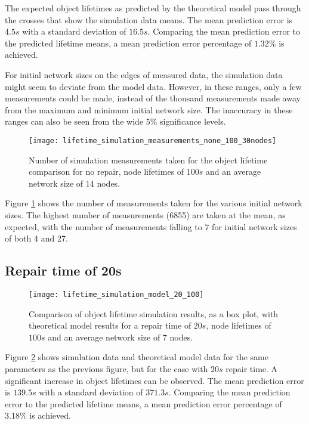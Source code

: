 The expected object lifetimes as predicted by the theoretical model pass through the crosses that show the simulation data means. The mean prediction error is $4.5s$ with a standard deviation of $16.5s$. Comparing the mean prediction error to the predicted lifetime means, a mean prediction error percentage of $1.32\%$ is achieved. 

For initial network sizes on the edges of measured data, the simulation data might seem to deviate from the model data. However, in these ranges, only a few measurements could be made, instead of the thousand measurements made away from the maximum and minimum initial network size. The inaccuracy in these ranges can also be seen from the wide 5\% significance levels.

\begin{figure}[htbp]
 \centering
 \texttt{[image: lifetime\_simulation\_measurements\_none\_100\_30nodes]}
 \caption{Number of simulation measurements taken for the object lifetime comparison for no repair, node lifetimes of $100s$ and an average network size of 14 nodes.}
 \label{fig_lifetime_simulation_measurements_30_100}
\end{figure}
%
Figure \ref{fig_lifetime_simulation_measurements_30_100} shows the number of measurements taken for the various initial network sizes. The highest number of measurements (6855) are taken at the mean, as expected, with the number of measurements falling to 7 for initial network sizes of both 4 and 27.

\subsection{Repair time of 20s}

\begin{figure}[htbp]
 \centering
 \texttt{[image: lifetime\_simulation\_model\_20\_100]}
 \caption{Comparison of object lifetime simulation results, as a box plot, with theoretical model results for a repair time of $20s$, node lifetimes of $100s$ and an average network size of 7 nodes.}
 \label{fig_lifetime_simulation_model_20_100}
\end{figure}
%
Figure \ref{fig_lifetime_simulation_model_20_100} shows simulation data and theoretical model data for the same parameters as the previous figure, but for the case with $20s$ repair time. A significant increase in object lifetimes can be observed. The mean prediction error is $139.5s$ with a standard deviation of $371.3s$. Comparing the mean prediction error to the predicted lifetime means, a mean prediction error percentage of $3.18\%$ is achieved.

